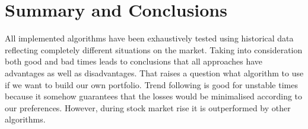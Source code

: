 
\section{Summary and Conclusions}
\label{sec:conclusions}

All implemented algorithms have been exhaustively tested using historical data reflecting completely different situations on the market.
Taking into consideration both good and bad times leads to conclusions that all approaches have advantages as well as disadvantages.
That raises a question what algorithm to use if we want to build our own portfolio.
Trend following is good for unstable times because it somehow guarantees that the losses would be minimalised according to our preferences.
However, during stock market rise it is outperformed by other algorithms.